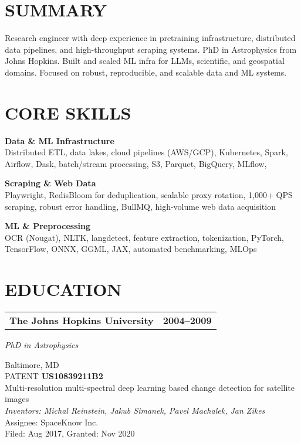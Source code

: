 \documentclass[11pt,a4paper]{moderncv}
\newcommand*{\educationentry}[4][0.5mm]{
    \begin{tabularx}{\textwidth}{LR}
        {\bfseries #3} & {\bfseries #4} \\
    \end{tabularx}
    {\itshape #2}
    \par\addvspace{#1}
}
\begin{document}
\begin{minipage}[t]{0.35\textwidth}
\section{SUMMARY}
Research engineer with deep experience in pretraining infrastructure, distributed data pipelines, and high-throughput scraping systems. PhD in Astrophysics from Johns Hopkins. Built and scaled ML infra for LLMs, scientific, and geospatial domains. Focused on robust, reproducible, and scalable data and ML systems.

\section{CORE SKILLS}
\textbf{Data \& ML Infrastructure} \\
Distributed ETL, data lakes, cloud pipelines (AWS/GCP), Kubernetes, Spark, Airflow, Dask, batch/stream processing, S3, Parquet, BigQuery, MLflow, 

\textbf{Scraping \& Web Data} \\
Playwright, RedisBloom for deduplication, scalable proxy rotation, 1,000+ QPS scraping, robust error handling, BullMQ, high-volume web data acquisition

\textbf{ML \& Preprocessing} \\
OCR (Nougat), NLTK, langdetect, feature extraction, tokenization, PyTorch, TensorFlow, ONNX, GGML, JAX, automated benchmarking, MLOps

\section{EDUCATION}
\educationentry{PhD in Astrophysics}{The Johns Hopkins University}{2004--2009}{Baltimore, MD}
\\

PATENT \textbf{US10839211B2} \\
Multi-resolution multi-spectral deep learning based change detection for satellite images \\
\emph{Inventors: Michal Reinstein, Jakub Simanek, Pavel Machalek, Jan Zikes} \\
Assignee: SpaceKnow Inc. \\
Filed: Aug 2017, Granted: Nov 2020 \\

\end{minipage}
\end{document}

